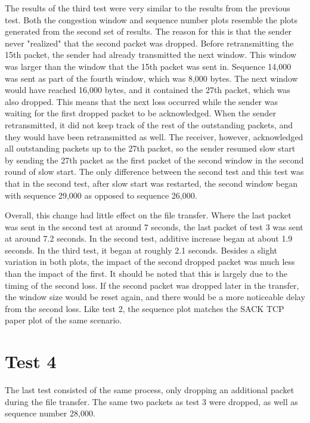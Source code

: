 \documentclass[fleqn,11pt]{article}
\begin{document}
	The results of the third test were very similar to the results from the previous test. Both
	the congestion window and sequence number plots resemble the plots generated from the second
	set of results. The reason for this is that the sender never "realized" that the second
	packet was dropped. Before retransmitting the 15th packet, the sender had already transmitted
	the next window. This window was larger than the window that the 15th packet was sent in. Sequence
	14,000 was sent as part of the fourth window, which was 8,000 bytes. The next window would have 
	reached 16,000 bytes, and it contained the 27th packet, which was also dropped. This means that
	the next loss occurred while the sender was waiting for the first dropped packet to be
	acknowledged. When the sender retransmitted, it did not keep track of the rest of the outstanding
	packets, and they would have been retransmitted as well. The receiver, however, acknowledged
	all outstanding packets up to the 27th packet, so the sender resumed slow start by sending the
	27th packet as the first packet of the second window in the second round of slow start.
	The only difference between the second test and this test was that in the second test, after
	slow start was restarted, the second window began with sequence 29,000 as opposed to sequence
	26,000.
	
	Overall, this change had little effect on the file transfer. Where the last packet was sent
	in the second test at around 7 seconds, the last packet of test 3 was sent at around 7.2 seconds.
	In the second test, additive increase began at about 1.9 seconds. In the third test, it began at
	roughly 2.1 seconds. Besides a slight variation in both plots, the impact of the second dropped packet
	was much less than the impact of the first. It should be noted that this is largely due to the timing
	of the second loss. If the second packet was dropped later in the transfer, the window size
	would be reset again, and there would be a more noticeable delay from the second loss. Like
	test 2, the sequence plot matches the SACK TCP paper plot of the same scenario.
	
	\section{Test 4}
	
	The last test consisted of the same process, only dropping an additional packet during the file
	transfer. The same two packets as test 3 were dropped, as well as sequence number 28,000.
	
\end{document}
